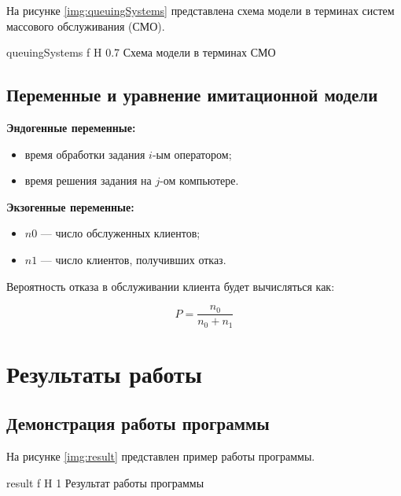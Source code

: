 \documentclass{bmstu}
\begin{document}
На рисунке \ref{img:queuingSystems} представлена схема модели в терминах систем массового обслуживания (СМО).

{queuingSystems} %
{f} %
{H} %
{0.7\textwidth} %
{Схема модели в терминах СМО} %


\section{Переменные и уравнение имитационной модели}

\textbf{Эндогенные переменные:}

\begin{itemize}
    \item время обработки задания $i$-ым оператором;
    \item время решения задания на $j$-ом компьютере.
\end{itemize}

\textbf{Экзогенные переменные:}

\begin{itemize}
    \item $n0$ — число обслуженных клиентов;
    \item $n1$ — число клиентов, получивших отказ.
\end{itemize}

Вероятность отказа в обслуживании клиента будет вычисляться как:

\begin{equation}
    P = \frac{n_0}{n_0 + n_1}
\end{equation}

\chapter{Результаты работы}


\section{Демонстрация работы программы}

На рисунке \ref{img:result} представлен пример работы программы.

{result} %
{f} %
{H} %
{1\textwidth} %
{Результат работы программы} %
\end{document}
